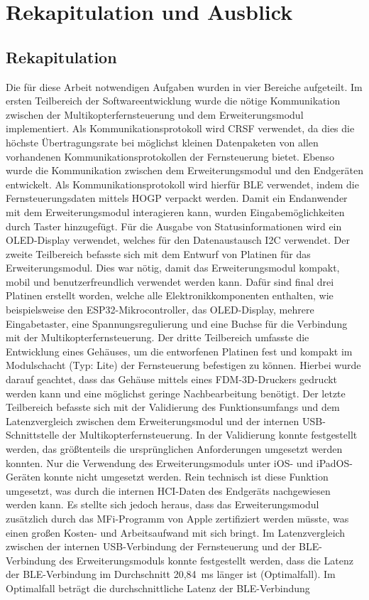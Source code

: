 
\chapter{Rekapitulation und Ausblick}
\section{Rekapitulation}

Die für diese Arbeit notwendigen Aufgaben wurden in vier Bereiche aufgeteilt. Im ersten Teilbereich der Softwareentwicklung wurde die nötige Kommunikation zwischen der Multikopterfernsteuerung und dem Erweiterungsmodul implementiert. Als Kommunikationsprotokoll wird CRSF verwendet, da dies die höchste Übertragungsrate bei möglichst kleinen Datenpaketen von allen vorhandenen Kommunikationsprotokollen der Fernsteuerung bietet. Ebenso wurde die Kommunikation zwischen dem Erweiterungsmodul und den Endgeräten entwickelt. Als Kommunikationsprotokoll wird hierfür \ac{BLE} verwendet, indem die Fernsteuerungsdaten mittels \ac{HOGP} verpackt werden. Damit ein Endanwender mit dem Erweiterungsmodul interagieren kann, wurden Eingabemöglichkeiten durch Taster hinzugefügt. Für die Ausgabe von Statusinformationen wird ein \acs{OLED}-Display verwendet, welches für den Datenaustausch \ac{I2C} verwendet. Der zweite Teilbereich befasste sich mit dem Entwurf von Platinen für das Erweiterungsmodul. Dies war nötig, damit das Erweiterungsmodul kompakt, mobil und benutzerfreundlich verwendet werden kann. Dafür sind final drei Platinen erstellt worden, welche alle Elektronikkomponenten enthalten, wie beispielsweise den ESP32-Mikrocontroller, das \acs{OLED}-Display, mehrere Eingabetaster, eine Spannungsregulierung und eine Buchse für die Verbindung mit der Multikopterfernsteuerung. Der dritte Teilbereich umfasste die Entwicklung eines Gehäuses, um die entworfenen Platinen fest und kompakt im Modulschacht (Typ: Lite) der Fernsteuerung befestigen zu können. Hierbei wurde darauf geachtet, dass das Gehäuse mittels eines \ac{FDM}-3D-Druckers gedruckt werden kann und eine möglichst geringe Nachbearbeitung benötigt. Der letzte Teilbereich befasste sich mit der Validierung des Funktionsumfangs und dem Latenzvergleich zwischen dem Erweiterungsmodul und der internen USB-Schnittstelle der Multikopterfernsteuerung. In der Validierung konnte festgestellt werden, das größtenteils die ursprünglichen Anforderungen umgesetzt werden konnten. Nur  die Verwendung des Erweiterungsmoduls unter iOS- und iPadOS-Geräten konnte nicht umgesetzt werden. Rein technisch ist diese Funktion umgesetzt, was durch die internen \ac{HCI}-Daten des Endgeräts nachgewiesen werden kann. Es stellte sich jedoch heraus, dass das Erweiterungsmodul zusätzlich durch das \ac{MFi}-Programm von Apple zertifiziert werden müsste, was einen großen Kosten- und Arbeitsaufwand mit sich bringt. Im Latenzvergleich zwischen der internen USB-Verbindung der Fernsteuerung und der \ac{BLE}-Verbindung des Erweiterungsmoduls konnte festgestellt werden, dass die Latenz der \ac{BLE}-Verbindung im Durchschnitt 20,84~ms länger ist (Optimalfall). Im Optimalfall beträgt die durchschnittliche Latenz der \ac{BLE}-Verbindung 